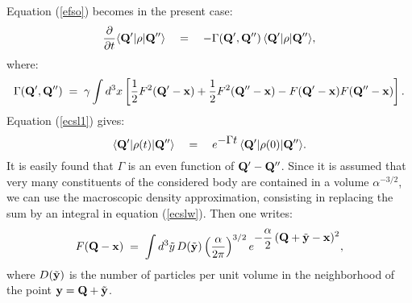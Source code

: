 \documentclass[12pt]{article}
\begin{document}
Equation (\ref{efso}) becomes in the present case:
\begin{equation} \label{ecsl1}
\frac{\partial}{\partial t} \langle {\bf Q}'| \rho |{\bf Q}''
\rangle \quad = \quad - \Gamma ({\bf Q}',{\bf Q}'')\, \langle {\bf
Q}'| \rho |{\bf Q}'' \rangle,
\end{equation}
where:
\begin{equation} \label{Paaaqvl}
\Gamma ({\bf Q}',{\bf Q}'') \; = \; \gamma \int d^{3} x \left[
\frac{1}{2} F^{2} ({\bf Q}' - {\bf x}) +  \frac{1}{2} F^{2} ({\bf
Q}'' - {\bf x})  - F({\bf Q}' - {\bf x}) F({\bf Q}'' - {\bf x})
\right].
\end{equation}
Equation (\ref{ecsl1}) gives:
\begin{equation} \label{qwer}
\langle {\bf Q}'| \rho(t) |{\bf Q}'' \rangle \quad = \quad
e^{\displaystyle - \Gamma t}\, \langle {\bf Q}'| \rho(0) |{\bf
Q}'' \rangle.
\end{equation}
It is easily found that $\Gamma$ is an even function of ${\bf Q}'
- {\bf Q}''$. Since it is assumed that very many constituents of
the considered body are contained in a volume $\alpha^{-3/2}$, we
can use the macroscopic density approximation, consisting in
replacing the sum by an integral in equation (\ref{ecslw}). Then
one writes:
\begin{equation} \label{escl3}
F({\bf Q} - {\bf x}) \; = \; \int d^{3} \tilde{y}\, D(\tilde{\bf
y}) \left(\frac{\alpha}{2\pi}\right)^{3/2} e^{\displaystyle -
\frac{\alpha}{2}\, ({\bf Q} + \tilde{\bf y} - {\bf x})^{2}} ,
\end{equation}
where $D(\tilde{\bf y})$ is the number of particles per unit
volume in the neighborhood of the point ${\bf y} = {\bf Q} +
\tilde{\bf y}$.
\end{document}

